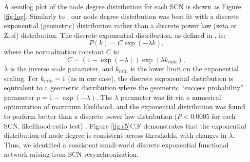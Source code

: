 A semilog plot of the node degree distribution for each SCN is shown as Figure \ref{fig:log}.
Similarly to \cite{Freeman2013a}, our node degree distribution was best fit with a discrete exponential (geometric) distribution rather than a discrete power law (zeta or Zipf) distribution.
The discrete exponential distribution, as defined in \cite{Clauset2009}, is:
\begin{equation}
    P(k) = C\exp(-\lambda k),
\end{equation}
where the normalization constant $C$ is:
\begin{equation}
    C = (1-\exp(-\lambda))\exp(\lambda k_{min}),
\end{equation}
$\lambda$ is the inverse scale parameter, and $k_{min}$ is the lower limit on the exponential scaling.
For $k_{min} = 1$ (as in our case), the discrete exponential distribution is equivalent to a geometric distribution where the geometric ``success probability'' parameter $p=1-\exp(-\lambda)$.
The $\lambda$ parameter was fit via a numerical optimization of maximum likelihood, and the exponential distribution was found to perform better than a discrete power law distribution ($P<0.0005$ for each SCN, likelihood-ratio test) \cite{Clauset2009,Alstott2014}.
Figure \ref{fig:s5}C,F demonstrates that the exponential distribution of node degree is consistent across thresholds, with changes in $\lambda$.
Thus, we identified a consistent small-world discrete exponential functional network arising from SCN resynchronization.

